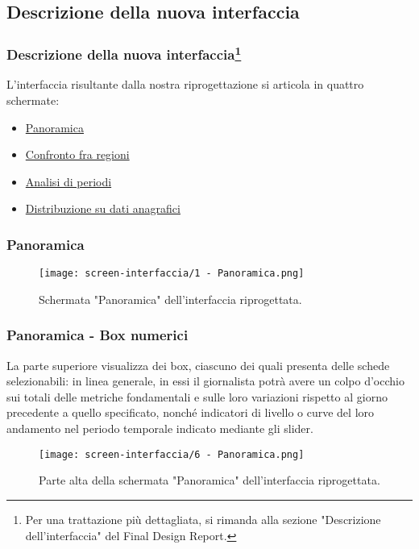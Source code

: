 \subsection{Descrizione della nuova interfaccia}
\begin{frame}
    \frametitle{Descrizione della nuova interfaccia\footnote{Per una trattazione più dettagliata, si rimanda alla sezione "Descrizione dell’interfaccia" del Final Design Report.}}
    L'interfaccia risultante dalla nostra riprogettazione si articola in quattro schermate: 
    \begin{itemize}
        \item \hyperlink{panoramica}{Panoramica} 
        \item \hyperlink{confronto-regioni}{Confronto fra regioni}
        \item \hyperlink{analisi-periodi}{Analisi di periodi}
        \item \hyperlink{distribuzione}{Distribuzione su dati anagrafici}
    \end{itemize}  

\end{frame}

\begin{frame}
    \frametitle{Panoramica}
    \label{panoramica}
    \begin{figure}
        \centering
        \texttt{[image: screen-interfaccia/1 - Panoramica.png]}
        \caption{Schermata "Panoramica" dell'interfaccia riprogettata.}
    \end{figure}
    
\end{frame}

\begin{frame}
    \frametitle{Panoramica - Box numerici}
    La parte superiore visualizza dei box, ciascuno dei quali presenta delle schede selezionabili: in linea generale, in essi il giornalista potrà avere un colpo d'occhio sui totali delle metriche fondamentali e sulle loro variazioni rispetto al giorno precedente a quello specificato, nonché indicatori di livello o curve del loro andamento nel periodo temporale indicato mediante gli slider.
    \begin{figure}
        \centering
        \texttt{[image: screen-interfaccia/6 - Panoramica.png]}
        \caption{Parte alta della schermata "Panoramica" dell'interfaccia riprogettata.}
    \end{figure}

\end{frame}


